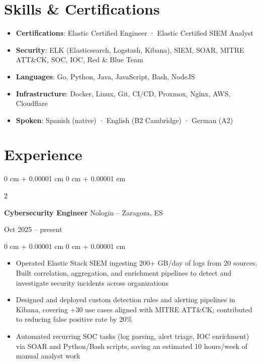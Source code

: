 \documentclass[10pt,a4paper,sans]{article}
\newenvironment{highlights}{
    \begin{itemize}[
        topsep=0.10 cm,
        parsep=0.10 cm,
        partopsep=0pt,
        itemsep=0pt,
        leftmargin=0 cm + 18pt
    ]
}{
    \end{itemize}
} %
\newenvironment{onecolentry}{
    \begin{adjustwidth}{
        0 cm + 0.00001 cm
    }{
        0 cm + 0.00001 cm
    }
}{
    \end{adjustwidth}
} %
\newenvironment{twocolentry}[2][]{
    \onecolentry
    \def\secondColumn{#2}
    \setcolumnwidth{\fill, 4.5 cm}
    \begin{paracol}{2}
}{
    \switchcolumn \raggedleft \secondColumn
    \end{paracol}
    \endonecolentry
} %
\begin{document}
    \section{
        Skills \& Certifications
    }

        \begin{itemize}[itemsep=-1pt]
            \item \textbf{Certifications}: Elastic Certified Engineer · Elastic Certified SIEM Analyst
            \item \textbf{Security}: ELK (Elasticsearch, Logstash, Kibana), SIEM, SOAR, MITRE ATT\&CK, SOC, IOC, Red \& Blue Team
            \item \textbf{Languages}: Go, Python, Java, JavaScript, Bash, NodeJS
            \item \textbf{Infrastructure}: Docker, Linux, Git, CI/CD, Proxmox, Nginx, AWS, Cloudflare
            \item \textbf{Spoken}: Spanish (native) · English (B2 Cambridge) · German (A2)
        \end{itemize}
        

    \section{Experience}
       
    \begin{twocolentry}{
        Oct 2025 – present
    }
        \textbf{Cybersecurity Engineer} Nologin -- Zaragoza, ES
    \end{twocolentry}

    \vspace{0.10 cm}
    \begin{onecolentry}
        \begin{highlights}
            \item Operated Elastic Stack SIEM ingesting 200+ GB/day of logs from 20 sources. Built correlation, aggregation, and enrichment pipelines to detect and investigate security incidents across organizations
            \item Designed and deployed custom detection rules and alerting pipelines in Kibana, covering +30 use cases aligned with MITRE ATT\&CK; contributed to reducing false positive rate by 20\%
            \item Automated recurring SOC tasks (log parsing, alert triage, IOC enrichment) via SOAR and Python/Bash scripts, saving an estimated 10 hours/week of manual analyst work
        \end{highlights}
    \end{onecolentry}
\end{document}
